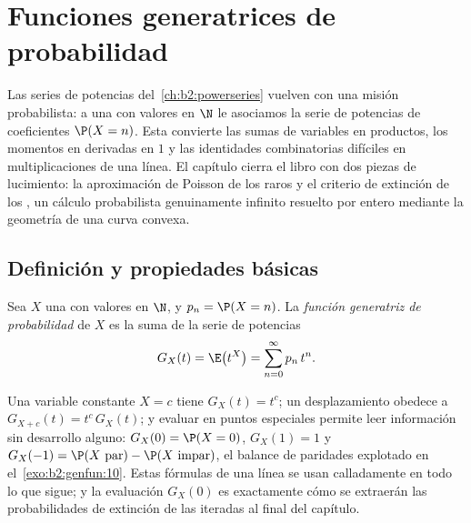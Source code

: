 \chapter{Funciones generatrices de probabilidad}\label{ch:b2:genfun}

Las series de potencias del~\cref{ch:b2:powerseries} vuelven con una
misión probabilista: a una  con valores en $\N$ le
asociamos la serie de potencias de coeficientes $\P(X = n)$. Esta
\emph{} convierte las sumas de variables
 en productos, los momentos en derivadas en $1$ y las
identidades combinatorias difíciles en multiplicaciones de una línea.
El capítulo cierra el libro con dos piezas de lucimiento: la
aproximación de Poisson de los  raros y el criterio de extinción
de los , un cálculo probabilista genuinamente
infinito resuelto por entero mediante la geometría de una curva
convexa.

\section{Definición y propiedades básicas}

\begin{definition}\label{def:b2:genfun:pgf}
Sea $X$ una  con valores en $\N$, y $p_n = \P(X =
n)$. La \emph{función generatriz de probabilidad} de $X$ es la suma de la serie de
potencias
\[
G_X(t) = \E\bigl(t^X\bigr) = \sum_{n=0}^{\infty} p_n\,t^n .
\]
\end{definition}

\begin{example}\label{ex:b2:genfun:firstreflexes}
Una variable constante $X = c$ tiene $G_X(t) = t^c$; un
desplazamiento obedece a $G_{X+c}(t) = t^c\,G_X(t)$; y evaluar en
puntos especiales permite leer información sin desarrollo alguno:
$G_X(0) = \P(X = 0)$, $G_X(1) = 1$ y $G_X(-1) = \P(X\text{ par}) -
\P(X\text{ impar})$, el balance de paridades explotado en el~\cref{exo:b2:genfun:10}. Estas fórmulas de una línea se usan
calladamente en todo lo que sigue; y la evaluación $G_X(0)$ es
exactamente cómo se extraerán las probabilidades de extinción de las
 iteradas al final del capítulo.
\end{example}


